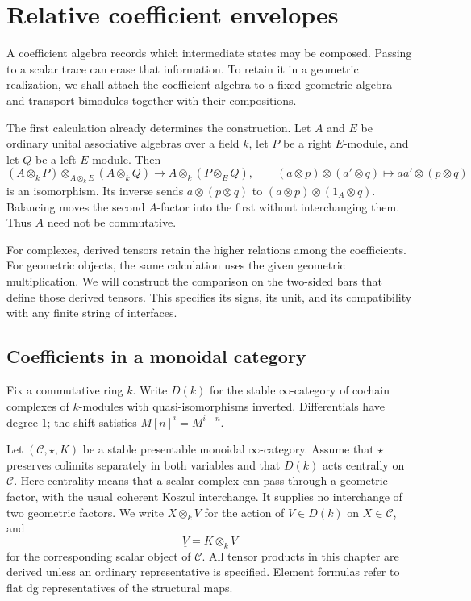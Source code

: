 \chapter{Relative coefficient envelopes}
\label{v4-ch:relative-coefficient-envelopes}

A coefficient algebra records which intermediate states may be
composed. Passing to a scalar trace can erase that information.
To retain it in a geometric realization, we shall attach the
coefficient algebra to a fixed geometric algebra and transport
bimodules together with their compositions.

The first calculation already determines the construction.
Let \(A\) and \(E\) be ordinary unital associative algebras over a field
\(k\), let \(P\) be a right \(E\)-module, and let \(Q\) be a left
\(E\)-module. Then
\[
 (A\otimes_kP)\otimes_{A\otimes_kE}(A\otimes_kQ)
 \longrightarrow A\otimes_k(P\otimes_EQ),
 \qquad
 (a\otimes p)\otimes(a'\otimes q)\longmapsto
 aa'\otimes(p\otimes q)
\]
is an isomorphism. Its inverse sends
\(a\otimes(p\otimes q)\) to
\((a\otimes p)\otimes(1_A\otimes q)\).
Balancing moves the second \(A\)-factor into the first without
interchanging them. Thus \(A\) need not be commutative.

For complexes, derived tensors retain the higher relations among
the coefficients. For geometric objects, the same calculation
uses the given geometric multiplication. We will construct the
comparison on the two-sided bars that define those derived
tensors. This specifies its signs, its unit, and its compatibility
with any finite string of interfaces.

\section{Coefficients in a monoidal category}
\label{v4-sec:relative-coefficient-setting}

Fix a commutative ring \(k\). Write \(D(k)\) for the stable
\(\infty\)-category of cochain complexes of \(k\)-modules
with quasi-isomorphisms inverted. Differentials have degree
\(1\); the shift satisfies
\(M[n]^i=M^{i+n}\).

Let \((\mathcal C,\star,K)\) be a stable presentable monoidal
\(\infty\)-category. Assume that \(\star\) preserves colimits separately in
both variables and that \(D(k)\) acts centrally on \(\mathcal C\).
Here centrality means that a scalar complex can pass through a
geometric factor, with the usual coherent Koszul interchange.
It supplies no interchange of two geometric factors.
We write \(X\otimes_kV\) for the action of \(V\in D(k)\) on
\(X\in\mathcal C\), and
\[
 \underline V=K\otimes_kV
\]
for the corresponding scalar object of \(\mathcal C\).
All tensor products in this chapter are derived unless an
ordinary representative is specified. Element formulas refer
to flat dg representatives of the structural maps.

